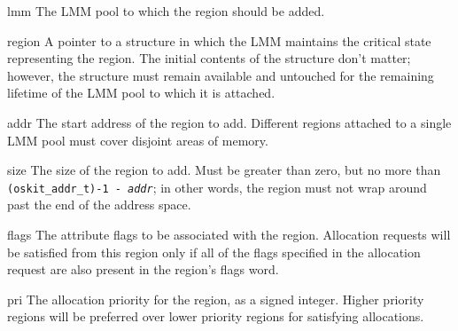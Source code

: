 \begin{apiparm}
	\item[lmm]
		The LMM pool to which the region should be added.
	\item[region]
		A pointer to a structure in which the LMM maintains
		the critical state representing the region.
		The initial contents of the structure don't matter;
		however, the structure must remain available and untouched
		for the remaining lifetime of the LMM pool
		to which it is attached.
	\item[addr]
		The start address of the region to add.
		Different regions attached to a single LMM pool
		must cover disjoint areas of memory.
	\item[size]
		The size of the region to add.
		Must be greater than zero,
		but no more than {\tt (oskit_addr_t)-1 - \emph{addr}};
		in other words, the region must not wrap around
		past the end of the address space.
	\item[flags]
		The attribute flags to be associated with the region.
		Allocation requests will be satisfied from this region
		only if all of the flags specified in the allocation request
		are also present in the region's flags word.
	\item[pri]
		The allocation priority for the region,
		as a signed integer.
		Higher priority regions will be preferred
		over lower priority regions for satisfying allocations.
\end{apiparm}

